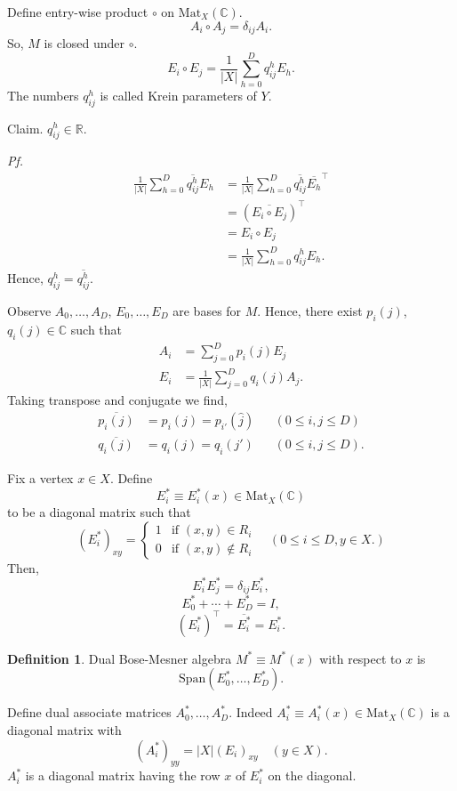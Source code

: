 \documentclass[
]{book}
\theoremstyle{definition}
\newtheorem{definition}{Definition}[chapter]
\theoremstyle{definition}
\theoremstyle{definition}
\theoremstyle{definition}
\theoremstyle{remark}
\begin{document}
Define entry-wise product \(\circ\) on \(\mathrm{Mat}_X(\mathbb{C})\).
\[A_i \circ A_j = \delta_{ij}A_i.\]
So, \(M\) is closed under \(\circ\).
\[E_i \circ E_j = \frac{1}{|X|}\sum_{h=0}^D q^h_{ij}E_h.\]
The numbers \(q^h_{ij}\) is called Krein parameters of \(Y\).

Claim. \(q^h_{ij}\in \mathbb{R}\).

\emph{Pf.}
\begin{align}
\frac{1}{|X|}\sum_{h=0}^D \overline{q^h_{ij}}E_h & = \frac{1}{|X|}\sum_{h=0}^D \overline{q^h_{ij}}\overline{E_h}^\top \\
& = (\overline{E_i\circ E_j})^\top \\
& = E_i\circ E_j \\
& = \frac{1}{|X|}\sum_{h=0}^D q^h_{ij}E_h.
\end{align}
Hence, \(q^h_{ij} = \overline{q^h_{ij}}\).

Observe
\(A_0, \ldots, A_D\), \(E_0, \ldots, E_D\) are bases for \(M\). Hence, there exist \(p_i(j)\), \(q_i(j)\in \mathbb{C}\) such that
\begin{align}
A_i & = \sum_{j = 0}^D p_i(j)E_j\\
E_i & = \frac{1}{|X|}\sum_{j=0}^D q_i(j)A_j.
\end{align}
Taking transpose and conjugate we find,
\begin{align}
\overline{p_i(j)} & =  p_i(j)  =  p_{i'}(\hat{j}) && (0\leq i,j\leq D)\\
\overline{q_i(j)} & =  q_i(j)  =  q_{\hat{i}}({j}') && (0\leq i,j\leq D).
\end{align}

Fix a vertex \(x\in X\). Define
\[E^*_i \equiv E^*_i(x) \in \mathrm{Mat}_X(\mathbb{C})\]
to be a diagonal matrix such that
\[(E^*_i)_{xy} = \begin{cases} 1 & \text{if } (x,y)\in R_i\\ 0 & \text{if } (x,y)\not\in R_i
\end{cases} \quad (0\leq i\leq D, y\in X.)\]
Then,
\[E^*_iE^*_j = \delta_{ij}E^*_i,\]
\[E^*_0 + \cdots + E^*_D = I,\]
\[(E^*_i)^\top = \overline{E^*_i} = E^*_i.\]

\begin{definition}
\protect\hypertarget{def:dual-bose-mesner}{}\label{def:dual-bose-mesner}Dual Bose-Mesner algebra  \(M^* \equiv M^*(x)\) with respect to \(x\) is
\[\mathrm{Span}(E^*_0, \ldots, E^*_D).\]
\end{definition}

Define dual associate matrices \(A_0^*, \ldots, A^*_D\).
Indeed \(A^*_i \equiv A^*_i(x)\in \mathrm{Mat}_X(\mathbb{C})\) is a diagonal matrix with
\[(A_i^*)_{yy} = |X|(E_i)_{xy}\quad (y\in X).\]
\(A^*_i\) is a diagonal matrix having the row \(x\) of \(E_i^*\) on the diagonal.
\end{document}
